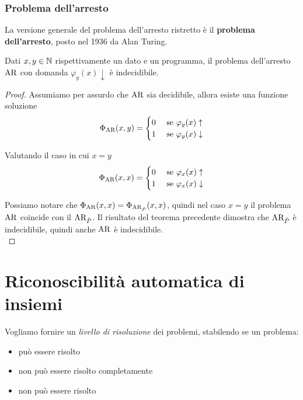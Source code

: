 \subsubsection{Problema dell'arresto}

La versione generale del problema dell'arresto ristretto è il \textbf{problema dell'arresto}, posto nel 1936 da Alan Turing.\\

\begin{theor}[Indecidibilità di $\ar$]
	Dati $x,y \in \mathbb{N}$ rispettivamente un dato e un programma, il problema dell'arresto $\ar$ con domanda $\varphi_y (x) \downarrow$ è indecidibile.
\end{theor}
\begin{proof}
	Assumiamo per assurdo che $\ar$ sia decidibile, allora esiste una funzione soluzione
	$$ 
	\Phi_{\text{AR}} (x,y) = \begin{cases}
		0 & \text{ se } \varphi_y (x) \uparrow \\
		1 & \text{ se } \varphi_y (x) \downarrow \\
	\end{cases}
	$$
	
	Valutando il caso in cui $x = y$
	$$ 
	\Phi_{\text{AR}} (x,x) = \begin{cases}
		0 & \text{ se } \varphi_x (x) \uparrow \\
		1 & \text{ se } \varphi_x (x) \downarrow \\
	\end{cases}
	$$
	
	Possiamo notare che $\Phi_{\text{AR}} (x,x) = \Phi_{\text{AR}_{\hat{P}}} (x,x)$, quindi nel caso $x = y$ il problema $\ar$ coincide con il $\text{AR}_{\hat{P}}$. Il risultato del teorema precedente dimostra che $\text{AR}_{\hat{P}}$ è indecidibile, quindi anche $\ar$ è indecidibile.\\
\end{proof}

\section{Riconoscibilità automatica di insiemi}

Vogliamo fornire un \textit{livello di risoluzione} dei problemi, stabilendo se un problema:
\begin{itemize}
	\item può essere risolto 
	\item non può essere risolto completamente
	\item non può essere risolto
\end{itemize} 

